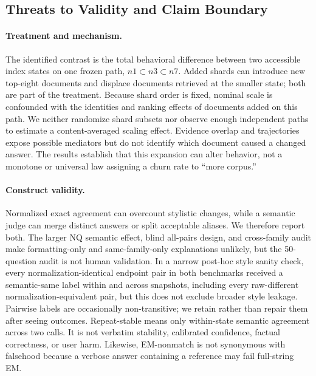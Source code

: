 \documentclass[sigconf,nonacm]{acmart}
\newcommand{\none}{\ensuremath{n1}}
\newcommand{\nthree}{\ensuremath{n3}}
\newcommand{\nseven}{\ensuremath{n7}}
\begin{document}
\subsection{Threats to Validity and Claim Boundary}

\paragraph{Treatment and mechanism.} The identified contrast is the total behavioral difference between two accessible index states on one frozen path, $\none\subset\nthree\subset\nseven$.  Added shards can introduce new top-eight documents and displace documents retrieved at the smaller state; both are part of the treatment.  Because shard order is fixed, nominal scale is confounded with the identities and ranking effects of documents added on this path.  We neither randomize shard subsets nor observe enough independent paths to estimate a content-averaged scaling effect.  Evidence overlap and trajectories expose possible mediators but do not identify which document caused a changed answer.  The results establish that this expansion can alter behavior, not a monotone or universal law assigning a churn rate to ``more corpus.''

\paragraph{Construct validity.} Normalized exact agreement can overcount stylistic changes, while a semantic judge can merge distinct answers or split acceptable aliases. We therefore report both. The larger NQ semantic effect, blind all-pairs design, and cross-family audit make formatting-only and same-family-only explanations unlikely, but the 50-question audit is not human validation. In a narrow post-hoc style sanity check, every normalization-identical endpoint pair in both benchmarks received a semantic-same label within and across snapshots, including every raw-different normalization-equivalent pair, but this does not exclude broader style leakage. Pairwise labels are occasionally non-transitive; we retain rather than repair them after seeing outcomes. Repeat-stable means only within-state semantic agreement across two calls. It is not verbatim stability, calibrated confidence, factual correctness, or user harm. Likewise, EM-nonmatch is not synonymous with falsehood because a verbose answer containing a reference may fail full-string EM.
\end{document}
